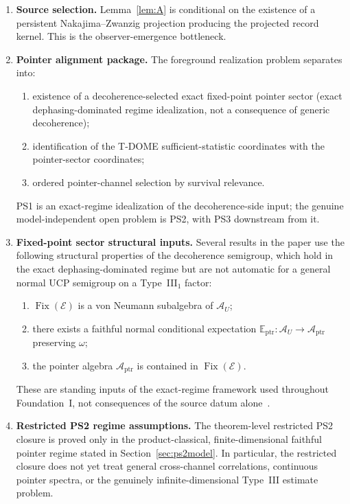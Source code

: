 \documentclass[12pt]{article}
\theoremstyle{definition}
\theoremstyle{remark}
\begin{document}
\begin{enumerate}
\item \textbf{Source selection.}
Lemma~\ref{lem:A} is conditional on the existence of a persistent
Nakajima--Zwanzig projection producing the projected record kernel.
This is the observer-emergence bottleneck.

\item \textbf{Pointer alignment package.}
The foreground realization problem separates into:
\begin{enumerate}
\item[(PS1)] existence of a decoherence-selected exact fixed-point
  pointer sector (exact dephasing-dominated regime idealization, not a
  consequence of generic decoherence);
\item[(PS2)] identification of the T-DOME sufficient-statistic
  coordinates with the pointer-sector coordinates;
\item[(PS3)] ordered pointer-channel selection by survival relevance.
\end{enumerate}
PS1 is an exact-regime idealization of the decoherence-side input; the
genuine model-independent open problem is PS2, with PS3 downstream
from it.

\item \textbf{Fixed-point sector structural inputs.}
Several results in the paper use the following structural properties of
the decoherence semigroup, which hold in the exact dephasing-dominated
regime but are not automatic for a general normal UCP semigroup on a
Type~III\(_1\) factor:
\begin{enumerate}
\item \(\operatorname{Fix}(\mathcal E)\) is a von Neumann subalgebra of
  \(\mathcal A_U\);
\item there exists a faithful normal conditional expectation
  \(\mathbb E_{\mathrm{ptr}}:\mathcal A_U\to
  \mathcal A_{\mathrm{ptr}}\) preserving \(\omega\);
\item the pointer algebra \(\mathcal A_{\mathrm{ptr}}\) is contained in
  \(\operatorname{Fix}(\mathcal E)\).
\end{enumerate}
These are standing inputs of the exact-regime framework used throughout
Foundation~I, not consequences of the source datum
alone~\cite{Takesaki1972,FrigerioVerri1982}.

\item \textbf{Restricted PS2 regime assumptions.}
The theorem-level restricted PS2 closure is proved only in the
product-classical, finite-dimensional faithful pointer regime stated in
Section~\ref{sec:ps2model}. In particular, the restricted closure does
not yet treat general cross-channel correlations, continuous pointer
spectra, or the genuinely infinite-dimensional Type~III estimate
problem.


\end{enumerate}
\end{document}

